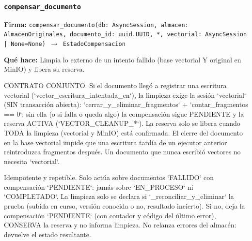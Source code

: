 \documentclass[11pt,a4paper]{article}
\begin{document}
\subsubsection*{\texttt{compensar\_documento}}
\textbf{Firma:} \texttt{compensar\_documento(db: AsyncSession, almacen: AlmacenOriginales, documento\_id: uuid.UUID, *, vectorial: AsyncSession | None=None) $\rightarrow$ EstadoCompensacion}

\textbf{Qué hace:} Limpia lo externo de un intento fallido (base vectorial Y original en MinIO) y libera su reserva.

CONTRATO CONJUNTO. Si el documento llegó a registrar una escritura vectorial
(`vector\_escritura\_intentada\_en`), la limpieza exige la sesión `vectorial` (SIN transacción abierta):
`cerrar\_y\_eliminar\_fragmentos` + `contar\_fragmentos == 0`; sin ella (o si falla o queda algo) la
compensación sigue PENDIENTE y la reserva ACTIVA (`VECTOR\_CLEANUP\_*`). La reserva solo se libera
cuando TODA la limpieza (vectorial y MinIO) está confirmada. El cierre del documento en la base
vectorial impide que una escritura tardía de un ejecutor anterior reintroduzca fragmentos después.
Un documento que nunca escribió vectores no necesita `vectorial`.

Idempotente y repetible. Solo actúa sobre documentos `FALLIDO` con compensación
`PENDIENTE`: jamás sobre `EN\_PROCESO` ni `COMPLETADO`. La limpieza solo se declara si
`\_reconciliar\_y\_eliminar` la prueba (subida en curso, versión conocida o no, resultado
incierto). Si no, deja la compensación `PENDIENTE` (con contador y código del último
error), CONSERVA la reserva y no informa limpieza. No relanza errores del almacén:
devuelve el estado resultante.
\end{document}
